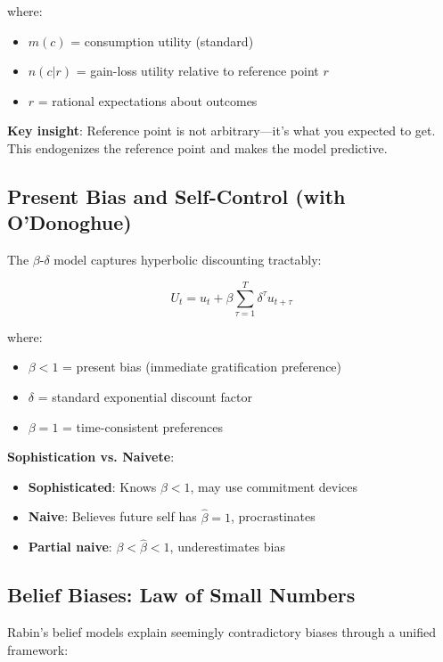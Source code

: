 where:
\begin{itemize}
    \item $m(c)$ = consumption utility (standard)
    \item $n(c|r)$ = gain-loss utility relative to reference point $r$
    \item $r$ = rational expectations about outcomes
\end{itemize}

\textbf{Key insight}: Reference point is not arbitrary---it's what you expected to get. This endogenizes the reference point and makes the model predictive.

\subsection{Present Bias and Self-Control (with O'Donoghue)}

The $\beta$-$\delta$ model captures hyperbolic discounting tractably:

\begin{equation}
U_t = u_t + \beta \sum_{\tau=1}^{T} \delta^\tau u_{t+\tau}
\end{equation}

where:
\begin{itemize}
    \item $\beta < 1$ = present bias (immediate gratification preference)
    \item $\delta$ = standard exponential discount factor
    \item $\beta = 1$ = time-consistent preferences
\end{itemize}

\textbf{Sophistication vs. Naivete}:
\begin{itemize}
    \item \textbf{Sophisticated}: Knows $\beta < 1$, may use commitment devices
    \item \textbf{Naive}: Believes future self has $\hat{\beta} = 1$, procrastinates
    \item \textbf{Partial naive}: $\beta < \hat{\beta} < 1$, underestimates bias
\end{itemize}

\subsection{Belief Biases: Law of Small Numbers}

Rabin's belief models explain seemingly contradictory biases through a unified framework:

